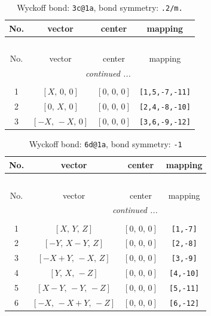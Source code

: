 \documentclass[fleqn,8pt]{jsarticle}
\begin{document}
\renewcommand{\arraystretch}{1.2}
\begin{longtable}{cccc}
\caption{Wyckoff bond: {\tt 3c@1a}, bond symmetry: {\tt .2/m.}}
 \\
 \hline \hline
No. & vector & center & mapping \\ \hline \endfirsthead

\multicolumn{3}{l}{\tablename\ \thetable{}} \\
 \hline \hline
No. & vector & center & mapping \\ \hline \endhead

 \hline \hline
\multicolumn{3}{r}{\footnotesize\it continued ...} \\ \endfoot

 \hline \hline
\multicolumn{3}{r}{} \\ \endlastfoot

1 & $\left[ X,\, 0,\, 0 \right]$ & $\left[ 0,\, 0,\, 0 \right]$ & {\tt [1,5,-7,-11]} \\ \hline
2 & $\left[ 0,\, X,\, 0 \right]$ & $\left[ 0,\, 0,\, 0 \right]$ & {\tt [2,4,-8,-10]} \\ \hline
3 & $\left[ - X,\, - X,\, 0 \right]$ & $\left[ 0,\, 0,\, 0 \right]$ & {\tt [3,6,-9,-12]} \\
\end{longtable}
\renewcommand{\arraystretch}{1.2}
\begin{longtable}{cccc}
\caption{Wyckoff bond: {\tt 6d@1a}, bond symmetry: {\tt -1}}
 \\
 \hline \hline
No. & vector & center & mapping \\ \hline \endfirsthead

\multicolumn{3}{l}{\tablename\ \thetable{}} \\
 \hline \hline
No. & vector & center & mapping \\ \hline \endhead

 \hline \hline
\multicolumn{3}{r}{\footnotesize\it continued ...} \\ \endfoot

 \hline \hline
\multicolumn{3}{r}{} \\ \endlastfoot

1 & $\left[ X,\, Y,\, Z \right]$ & $\left[ 0,\, 0,\, 0 \right]$ & {\tt [1,-7]} \\ \hline
2 & $\left[ - Y,\, X - Y,\, Z \right]$ & $\left[ 0,\, 0,\, 0 \right]$ & {\tt [2,-8]} \\ \hline
3 & $\left[ - X + Y,\, - X,\, Z \right]$ & $\left[ 0,\, 0,\, 0 \right]$ & {\tt [3,-9]} \\ \hline
4 & $\left[ Y,\, X,\, - Z \right]$ & $\left[ 0,\, 0,\, 0 \right]$ & {\tt [4,-10]} \\ \hline
5 & $\left[ X - Y,\, - Y,\, - Z \right]$ & $\left[ 0,\, 0,\, 0 \right]$ & {\tt [5,-11]} \\ \hline
6 & $\left[ - X,\, - X + Y,\, - Z \right]$ & $\left[ 0,\, 0,\, 0 \right]$ & {\tt [6,-12]} \\
\end{longtable}
\end{document}
